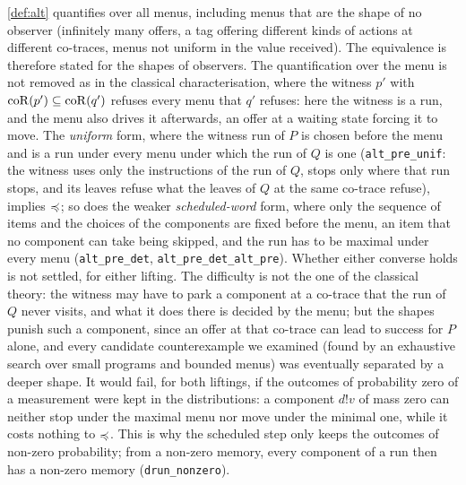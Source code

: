 \begin{remark}
\cref{def:alt} quantifies over all menus, including menus that are the shape
of no observer (infinitely many offers, a tag offering different kinds of
actions at different co-traces, menus not uniform in the value received).
The equivalence is therefore stated for the shapes of observers. The
quantification over the menu is not removed as in the classical
characterisation, where the witness $p'$ with $\mathrm{coR}(p') \subseteq
\mathrm{coR}(q')$ refuses every menu that $q'$ refuses: here the witness is a run,
and the menu also drives it afterwards, an offer at a waiting state forcing
it to move. The \emph{uniform} form, where the witness run of $P$ is chosen
before the menu and is a run under every menu under which the run of $Q$ is
one (\texttt{alt\_pre\_unif}: the witness uses only the instructions of the
run of $Q$, stops only where that run stops, and its leaves refuse what the
leaves of $Q$ at the same co-trace refuse), implies $\preccurlyeq$; so does the
weaker \emph{scheduled-word} form, where only the sequence of items and the
choices of the components are fixed before the menu, an item that no
component can take being skipped, and the run has to be maximal under every
menu (\texttt{alt\_pre\_det}, \texttt{alt\_pre\_det\_alt\_pre}). Whether
either converse holds is not settled, for either lifting. The
difficulty is not the one of the classical theory: the witness may have to
park a component at a co-trace that the run of $Q$ never visits, and what
it does there is decided by the menu; but the shapes punish such a
component, since an offer at that co-trace can lead to success for $P$
alone, and every candidate counterexample we examined (found by an
exhaustive search over small programs and bounded menus) was eventually
separated by a deeper shape. It would fail, for both liftings, if the
outcomes of probability zero of a measurement were kept in the
distributions: a component $d!v$ of
mass zero can neither stop under the maximal menu nor move under the
minimal one, while it costs nothing to $\preccurlyeq$. This is why the scheduled
step only keeps the outcomes of non-zero probability; from a non-zero
memory, every component of a run then has a non-zero memory
(\texttt{drun\_nonzero}).
\end{remark}
